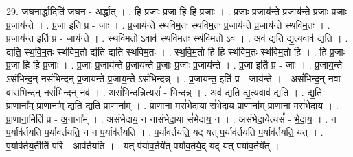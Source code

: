 \documentclass[17pt]{extarticle}
\begin{document}
29. ज॒घ॒ना॒र्द्धादिति॑ जघन - अ॒र्द्धात् । . हि प्र॒जाः प्र॒जा हि हि प्र॒जाः । . प्र॒जाः प्र॒जाय॑न्ते प्र॒जाय॑न्ते प्र॒जाः प्र॒जाः प्र॒जाय॑न्ते । . प्र॒जा इति॑ प्र - जाः । . प्र॒जाय॑न्ते स्थविम॒तः स्थ॑विम॒तः प्र॒जाय॑न्ते प्र॒जाय॑न्ते स्थविम॒तः । . प्र॒जाय॑न्त॒ इति॑ प्र - जाय॑न्ते । . स्थ॒वि॒म॒तो ऽवाव॑ स्थविम॒तः स्थ॑विम॒तो ऽव॑ । . अव॑ द्यति द्य॒त्यवाव॑ द्यति । . द्य॒ति॒ स्थ॒वि॒म॒तः स्थ॑विम॒तो द्य॑ति द्यति स्थविम॒तः । . स्थ॒वि॒म॒तो हि हि स्थ॑विम॒तः स्थ॑विम॒तो हि । . हि प्र॒जाः प्र॒जा हि हि प्र॒जाः । . प्र॒जाः प्र॒जाय॑न्ते प्र॒जाय॑न्ते प्र॒जाः प्र॒जाः प्र॒जाय॑न्ते । . प्र॒जा इति॑ प्र - जाः । . प्र॒जाय॒न्ते ऽसं॑भिन्द॒न् नसं॑भिन्दन् प्र॒जाय॑न्ते प्र॒जाय॒न्ते ऽसं॑भिन्दन्न् । . प्र॒जाय॑न्त॒ इति॑ प्र - जाय॑न्ते । . असं॑भिन्द॒न् नवा वासं॑भिन्द॒न् नसं॑भिन्द॒न् नव॑ । . असं॑भिन्द॒न्नित्यसं᳚ - भि॒न्द॒न्न् । . अव॑ द्यति द्य॒त्यवाव॑ द्यति । . द्य॒ति॒ प्रा॒णाना᳚म् प्रा॒णाना᳚म् द्यति द्यति प्रा॒णाना᳚म् । . प्रा॒णाना॒ मसं॑भेदा॒या सं॑भेदाय प्रा॒णाना᳚म् प्रा॒णाना॒ मसं॑भेदाय । . प्रा॒णाना॒मिति॑ प्र - अ॒नाना᳚म् । . असं॑भेदाय॒ न नासं॑भेदा॒या सं॑भेदाय॒ न । . असं॑भेदा॒येत्यसं᳚ - भे॒दा॒य॒ । . न प॒र्याव॑र्तयति प॒र्याव॑र्तयति॒ न न प॒र्याव॑र्तयति । . प॒र्याव॑र्तयति॒ यद् यत् प॒र्याव॑र्तयति प॒र्याव॑र्तयति॒ यत् । . प॒र्याव॑र्तय॒तीति॑ परि - आव॑र्तयति । . यत् प॑र्याव॒र्तये᳚त् पर्याव॒र्तये॒द् यद् यत् प॑र्याव॒र्तये᳚त् । \newline
\end{document}
